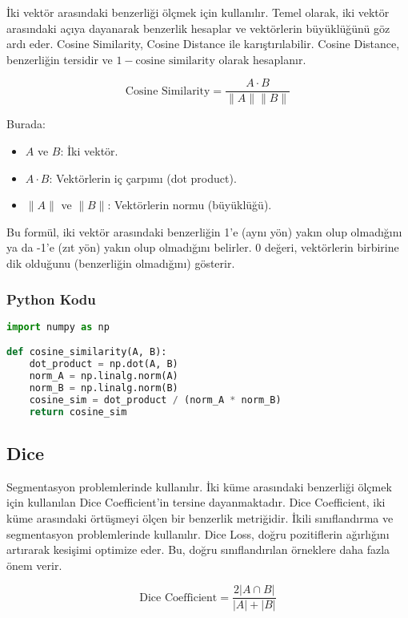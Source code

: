 İki vektör arasındaki benzerliği ölçmek için kullanılır. Temel olarak, iki vektör arasındaki açıya dayanarak benzerlik hesaplar ve vektörlerin büyüklüğünü göz ardı eder. Cosine Similarity, Cosine Distance ile karıştırılabilir. Cosine Distance, benzerliğin tersidir ve $1 - \text{cosine similarity}$ olarak hesaplanır.

\[ \text{Cosine Similarity} = \frac{A \cdot B}{\| A \| \| B \|} \]

Burada:

\begin{itemize}
    \item $A$ ve $B$: İki vektör.
    \item $A \cdot B$: Vektörlerin iç çarpımı (dot product).
    \item $\| A \|$ ve $\| B \|$: Vektörlerin normu (büyüklüğü).
\end{itemize}

Bu formül, iki vektör arasındaki benzerliğin 1'e (aynı yön) yakın olup olmadığını ya da -1'e (zıt yön) yakın olup olmadığını belirler. 0 değeri, vektörlerin birbirine dik olduğunu (benzerliğin olmadığını) gösterir.

\subsubsection{Python Kodu}

\begin{lstlisting}[language=Python]
import numpy as np

def cosine_similarity(A, B):
    dot_product = np.dot(A, B)
    norm_A = np.linalg.norm(A)
    norm_B = np.linalg.norm(B)
    cosine_sim = dot_product / (norm_A * norm_B)
    return cosine_sim
\end{lstlisting}

\newpage

\subsection{Dice}

Segmentasyon problemlerinde kullanılır. İki küme arasındaki benzerliği ölçmek için kullanılan Dice Coefficient'in tersine dayanmaktadır. Dice Coefficient, iki küme arasındaki örtüşmeyi ölçen bir benzerlik metriğidir. İkili sınıflandırma ve segmentasyon problemlerinde kullanılır. Dice Loss, doğru pozitiflerin ağırlığını artırarak kesişimi optimize eder. Bu, doğru sınıflandırılan örneklere daha fazla önem verir.

\[ \text{Dice Coefficient} = \frac{2 | A \cap B |}{|A| + |B|} \]

